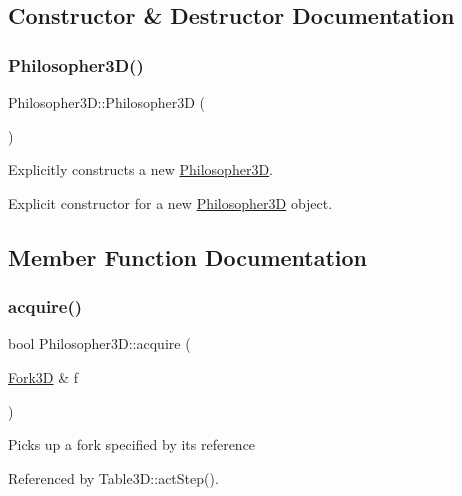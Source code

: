 \subsection{Constructor \& Destructor Documentation}
\mbox{\label{class_philosopher3_d_ac45678c5f33b97bcff814df559ea0ebb}} 
\subsubsection{\texorpdfstring{Philosopher3\+D()}{Philosopher3D()}}
{\footnotesize\ttfamily Philosopher3\+D\+::\+Philosopher3D (\begin{DoxyParamCaption}{ }\end{DoxyParamCaption})}



Explicitly constructs a new \hyperlink{class_philosopher3_d}{Philosopher3D}. 

Explicit constructor for a new \hyperlink{class_philosopher3_d}{Philosopher3D} object. 

\subsection{Member Function Documentation}
\mbox{\label{class_philosopher3_d_a55a0b5fa883f9304e93e386d75b0cb2a}} 
\subsubsection{\texorpdfstring{acquire()}{acquire()}}
{\footnotesize\ttfamily bool Philosopher3\+D\+::acquire (\begin{DoxyParamCaption}\item[{\hyperlink{struct_fork3_d}{Fork3D} \&}]{f }\end{DoxyParamCaption})}

Picks up a fork specified by its reference 

Referenced by Table3\+D\+::act\+Step().

\mbox{\label{class_philosopher3_d_a4dc5329e128f072695d216af3867b4b4}} 
